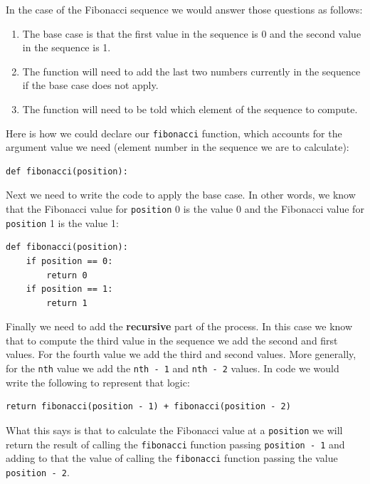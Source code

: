 In the case of the Fibonacci sequence we would answer those questions as follows:

\begin{enumerate}
	\item The base case is that the first value in the sequence is 0 and the second value in the sequence is 1.

	\item The function will need to add the last two numbers currently in the sequence if the base case does not apply.

	\item The function will need to be told which element of the sequence to compute.
\end{enumerate}

Here is how we could declare our \texttt{fibonacci} function, which accounts for the argument value we need (element number in the sequence we are to calculate):

\beforeverb
\begin{verbatim}
def fibonacci(position):
\end{verbatim}
\afterverb

Next we need to write the code to apply the base case. In other words, we know that the Fibonacci value for \texttt{position} 0 is the value 0 and the Fibonacci value for \texttt{position} 1 is the value 1:

\beforeverb
\begin{verbatim}
def fibonacci(position):
    if position == 0:
        return 0
    if position == 1:
        return 1
\end{verbatim}
\afterverb

Finally we need to add the \textbf{recursive} part of the process. In this case we know that to compute the third value in the sequence we add the second and first values. For the fourth value we add the third and second values. More generally, for the \texttt{nth} value we add the \texttt{nth~-~1} and \texttt{nth~-~2} values. In code we would write the following to represent that logic:

\beforeverb
\begin{verbatim}
return fibonacci(position - 1) + fibonacci(position - 2)
\end{verbatim}
\afterverb

What this says is that to calculate the Fibonacci value at a \texttt{position} we will return the result of calling the \texttt{fibonacci} function passing \texttt{position~-~1} and adding to that the value of calling the \texttt{fibonacci} function passing the value \texttt{position~-~2}.

